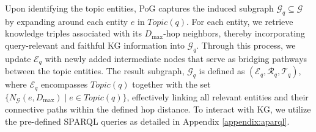 
Upon identifying the topic entities, PoG captures the induced subgraph $\mathcal{G}_q \subseteq \mathcal{G}$ by expanding around each entity $e$ in $Topic(q)$. For each entity, we retrieve knowledge triples associated with its $D_{\max}$-hop neighbors, thereby incorporating query-relevant and faithful KG information into $\mathcal{G}_q$. Through this process, we update $\mathcal{E}_q$ with newly added intermediate nodes that serve as bridging pathways between the topic entities. The result subgraph, $\mathcal{G}_q$ is defined as $(\mathcal{E}_q, \mathcal{R}_q, \mathcal{T}_q)$, where $\mathcal{E}_q$ encompasses $Topic(q)$ together with the set $\{N_\mathcal{G}(e, D_{\max}) \mid e \in Topic(q)\}$, effectively linking all relevant entities and their connective paths within the defined hop distance. To interact with KG, we utilize the pre-defined SPARQL queries as detailed in Appendix \ref{appendix:aparql}.



